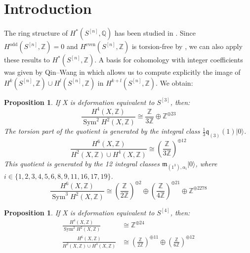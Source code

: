 \documentclass{amsart}
\DeclareMathOperator{\Sym}{Sym}
\newcommand{\hilb}[1]{^{[#1]}}
\newcommand{\vac}{|0\rangle}
\newcommand{\IQ}{\mathbb{Q}}
\newcommand{\IZ}{\mathbb{Z}}
\newcommand{\km}{\mathfrak{m}}
\newcommand{\kq}{\mathfrak{q}}
\theoremstyle{plain}
\newtheorem{proposition}[theorem]{Proposition}
\theoremstyle{definition}
\theoremstyle{remark}
\begin{document}
\section{Introduction}

The ring structure of $H^\ast(S\hilb{n}, \IQ)$ has been studied in \cite{LehnSorger}. 
Since $H^\text{odd}(S\hilb{n},\IZ) = 0$ and $H^\text{even}(S\hilb{n},\IZ)$ is torsion-free by \cite{Markman}, we can also apply these results to  $H^\ast(S\hilb{n}, \IZ)$. A basis for cohomology with integer coefficients was given by Qin--Wang in \cite{QinWang} which allows us to compute explicitly the image of $H^k(S\hilb{n}, \IZ) \cup H^l(S\hilb{n}, \IZ)$ in $H^{k+l}(S\hilb{n}, \IZ)$. We obtain:
\begin{proposition}
If X is deformation equivalent to $S\hilb{3}$, then:
$$
\frac{H^4(X,\IZ)}{\Sym^2 H^2(X,\IZ)} \cong \frac{\IZ}{3\IZ} \oplus \IZ^ {\oplus 23} 
$$
The torsion part of the quotient is generated by the integral class $\frac{1}{3}\kq_{(3)}(1)\vac$.
$$
\frac{H^6(X,\IZ)}{H^2(X,\IZ)\cup H^4(X,\IZ)} \cong \left(\frac{\IZ}{3\IZ}\right)^{\oplus 12} 
$$
This quotient is generated by the 12 integral classes $\km_{(1^3),\alpha_i}\vac$, where \\$ i \in \{ 1,2,3,4,5,6,8,9,11,16,17,19 \}$.
$$
\frac{H^6(X,\IZ)}{\Sym^3 H^2(X,\IZ)} \cong  \left(\frac{\IZ}{2\IZ}\right)^{\oplus 2}\oplus \left(\frac{\IZ}{4\IZ}\right)^{\oplus 21} \oplus \IZ^{\oplus  2278}
$$
\end{proposition}
\begin{proposition}
If X is deformation equivalent to $S\hilb{4}$, then:
\begin{align*}
\frac{H^4(X,\IZ)}{\Sym^2 H^2(X,\IZ)} &\cong \IZ^{\oplus 24} \\
\frac{H^6(X,\IZ)}{H^2(X,\IZ)\cup H^4(X,\IZ)} &\cong \left(\frac{\IZ}{2\IZ}\right)^{\oplus 11} \oplus \left(\frac{\IZ}{6\IZ}\right)^{\oplus 12} \\
\end{align*}
\end{proposition}




\end{document}
